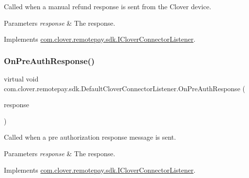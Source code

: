 Called when a manual refund response is sent from the Clover device. 


\begin{DoxyParams}{Parameters}
{\em response} & The response.\\
\hline
\end{DoxyParams}


Implements \hyperlink{interfacecom_1_1clover_1_1remotepay_1_1sdk_1_1_i_clover_connector_listener_a816b762344c31db77125abe68fe2c125}{com.\+clover.\+remotepay.\+sdk.\+I\+Clover\+Connector\+Listener}.

\mbox{\label{classcom_1_1clover_1_1remotepay_1_1sdk_1_1_default_clover_connector_listener_a780336c5a5388a0dc223e59f527e2f1d}} 
\subsubsection{\texorpdfstring{On\+Pre\+Auth\+Response()}{OnPreAuthResponse()}}
{\footnotesize\ttfamily virtual void com.\+clover.\+remotepay.\+sdk.\+Default\+Clover\+Connector\+Listener.\+On\+Pre\+Auth\+Response (\begin{DoxyParamCaption}\item[{\hyperlink{classcom_1_1clover_1_1remotepay_1_1sdk_1_1_pre_auth_response}{Pre\+Auth\+Response}}]{response }\end{DoxyParamCaption})\hspace{0.3cm}{\ttfamily [virtual]}}



Called when a pre authorization response message is sent. 


\begin{DoxyParams}{Parameters}
{\em response} & The response.\\
\hline
\end{DoxyParams}


Implements \hyperlink{interfacecom_1_1clover_1_1remotepay_1_1sdk_1_1_i_clover_connector_listener_ad3fd2383d245798a6da5f11bbc3dd5fc}{com.\+clover.\+remotepay.\+sdk.\+I\+Clover\+Connector\+Listener}.

